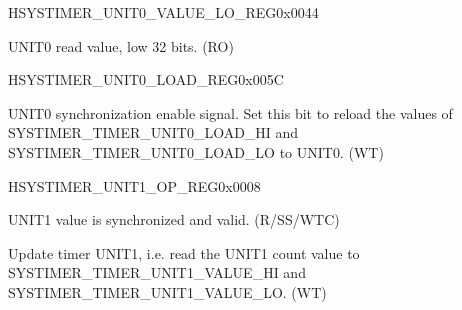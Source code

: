 \begin{register}{H}{SYSTIMER\_UNIT0\_VALUE\_LO\_REG}{0x0044}\label{regdesc:SYSTIMERUNIT0VALUELOREG}
%
\regnewline%
\begin{regdesc}\begin{reglist}
\label{fielddesc:SYSTIMERTIMERUNIT0VALUELO}\item [SYSTIMER\_TIMER\_UNIT0\_VALUE\_LO] UNIT0 read value, low 32 bits. (RO)
\end{reglist}\end{regdesc}
\end{register}


\begin{register}{H}{SYSTIMER\_UNIT0\_LOAD\_REG}{0x005C}\label{regdesc:SYSTIMERUNIT0LOADREG}
%
%
\regnewline%
\begin{regdesc}\begin{reglist}
\label{fielddesc:SYSTIMERTIMERUNIT0LOAD}\item [SYSTIMER\_TIMER\_UNIT0\_LOAD] UNIT0 synchronization enable signal. Set this bit to reload the values of SYSTIMER\_TIMER\_UNIT0\_LOAD\_HI and SYSTIMER\_TIMER\_UNIT0\_LOAD\_LO to UNIT0. (WT)
\end{reglist}\end{regdesc}
\end{register}


\begin{register}{H}{SYSTIMER\_UNIT1\_OP\_REG}{0x0008}\label{regdesc:SYSTIMERUNIT1OPREG}
%
%
%
%
\regnewline%
\begin{regdesc}\begin{reglist}
\label{fielddesc:SYSTIMERTIMERUNIT1VALUEVALID}\item [SYSTIMER\_TIMER\_UNIT1\_VALUE\_VALID] UNIT1 value is synchronized and valid. (R/SS/WTC)
\label{fielddesc:SYSTIMERTIMERUNIT1UPDATE}\item [SYSTIMER\_TIMER\_UNIT1\_UPDATE] Update timer UNIT1, i.e. read the UNIT1 count value to SYSTIMER\_TIMER\_UNIT1\_VALUE\_HI and SYSTIMER\_TIMER\_UNIT1\_VALUE\_LO. (WT)
\end{reglist}\end{regdesc}
\end{register}


